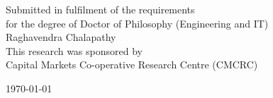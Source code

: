 \begin{titlepage}
\begin{center}

\vspace{1cm}

\large { Submitted in fulfilment of the requirements\\ for the degree of Doctor of Philosophy (Engineering and IT)}
 \\[2cm]
 \LARGE Raghavendra Chalapathy \\[1cm]
\small This research was sponsored by \\
  Capital Markets Co-operative Research Centre (CMCRC)\\

\vfill

{\large \today}\\[4cm]

\vfill
\date{  Copyright {\textcopyright}  2018 Raghavendra Chalapathy \\
All Rights Reserved
}
\end{center}
\end{titlepage}

\maketitle
